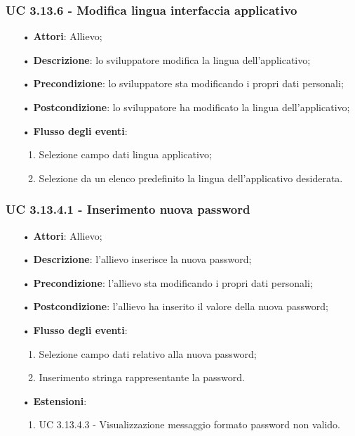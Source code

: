 \subsubsection{UC 3.13.6 - Modifica lingua interfaccia applicativo}
\begin{itemize}
	\item[•]\textbf{Attori}: Allievo;
	\item[•]\textbf{Descrizione}: lo sviluppatore modifica la lingua dell'applicativo;
	\item[•]\textbf{Precondizione}: lo sviluppatore sta modificando i propri dati personali;
	\item[•]\textbf{Postcondizione}: lo sviluppatore ha modificato la lingua dell'applicativo; 
	\item[•]\textbf{Flusso degli eventi}: 
	\begin{enumerate}
		\item Selezione campo dati lingua applicativo;
		\item Selezione da un elenco predefinito la lingua dell'applicativo desiderata.
	\end{enumerate}
\end{itemize}

\subsubsection{UC 3.13.4.1 - Inserimento nuova password}
\begin{itemize}
	\item[•]\textbf{Attori}: Allievo;
	\item[•]\textbf{Descrizione}: l'allievo inserisce la nuova password;
	\item[•]\textbf{Precondizione}: l'allievo sta modificando i propri dati personali;
	\item[•]\textbf{Postcondizione}: l'allievo ha inserito il valore della nuova password; 
	\item[•]\textbf{Flusso degli eventi}: 
	\begin{enumerate}
		\item Selezione campo dati relativo alla nuova password;
		\item Inserimento stringa rappresentante la password.
	\end{enumerate}
	\item[•]\textbf{Estensioni}:
	\begin{enumerate}
		\item UC 3.13.4.3 - Visualizzazione messaggio formato password non valido.
	\end{enumerate}
\end{itemize}

